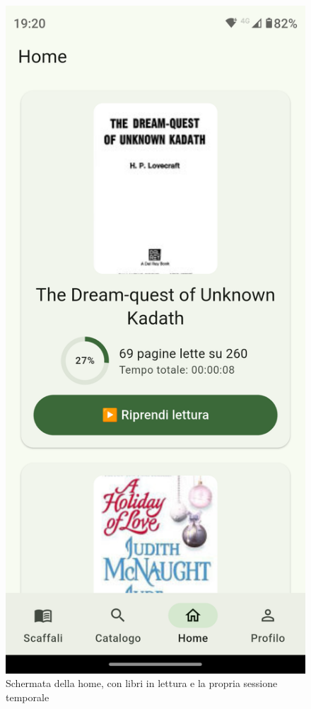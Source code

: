 \documentclass{article}
\begin{document}
\begin{figure}[H]
  \centering
  \includegraphics[width=0.6\linewidth]{home-f.png}
  \caption{Schermata della home, con libri in lettura e la propria sessione temporale}
  \label{fig:sitemap}
\end{figure}
\end{document}
